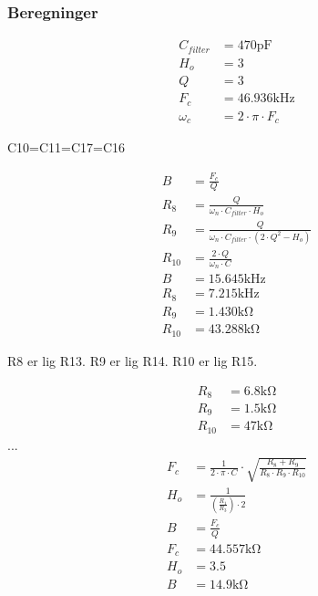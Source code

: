 \subsubsection{Beregninger}

\begin{align}
C_{filter} & = 470 \si{\pico\farad} \nonumber \\
H_o & = 3 \nonumber \\
Q & = 3 \nonumber \\
F_c & = 46.936 \si{\kilo\hertz} \nonumber \\
\omega_c & = 2 \cdot \pi \cdot F_c
\end{align}

C10=C11=C17=C16

\begin{align}
B & = \frac{F_c}{Q} \\
R_8 & = \frac{Q}{\omega_n \cdot C_{filter} \cdot H_o } \\
R_9 & = \frac{Q}{ \omega_n \cdot C_{filter} \cdot \left( 2 \cdot Q^2 - H_o \right) } \\
R_{10} & = \frac{2 \cdot Q}{ \omega_n \cdot C} \\
B & = 15.645 \si{\kilo\hertz} \nonumber \\
R_8 & = 7.215 \si{\kilo\hertz} \nonumber \\
R_9 & = 1.430 \si{\kilo\ohm} \nonumber \\
R_{10} & = 43.288 \si{\kilo\ohm} \nonumber 
\end{align}

R8 er lig R13. R9 er lig R14. R10 er lig R15.

\begin{align}
	R_8 & = 6.8 \si{\kilo\ohm} \nonumber \\
	R_9 & = 1.5 \si{\kilo\ohm} \nonumber \\
	R_{10} & = 47 \si{\kilo\ohm} \nonumber
\end{align}
...
\begin{align}
	F_c & = \frac{1}{2 \cdot \pi \cdot C} \cdot \sqrt{\frac{R_8+R_9}{R_8 \cdot R_9 \cdot R_{10}}} \\
	H_o & = \frac{1}{\left( \frac{R_1}{R_3} \right) \cdot 2} \\
	B & = \frac{F_c}{Q} \\
	F_c & = 44.557 \si{\kilo\ohm} \nonumber \\
	H_o & = 3.5 \nonumber \\
	B & = 14.9 \si{\kilo\ohm} \nonumber
\end{align}

